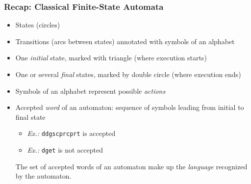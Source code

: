 \documentclass{beamer}
\begin{document}
\begin{frame}[fragile]\frametitle{Recap: Classical Finite-State Automata}
  
  \begin{itemize}
  \item States (circles)
  \item Transitions (arcs between states) annotated with symbols of an alphabet
  \item One \emph{initial} state, marked with triangle (where execution starts)
  \item One or several \emph{final} states, marked by double circle (where execution ends)
  \end{itemize}


  \begin{itemize}
  \item Symbols of an alphabet represent possible \emph{actions}
  \item Accepted \emph{word} of an automaton: sequence of symbols leading from initial to final state
    \begin{itemize}
    \item \emph{Ex.:}  \texttt{ddgscprcprt} is accepted
    \item \emph{Ex.:} \texttt{dget} is not accepted
    \end{itemize}
    The set of accepted words of an automaton make up the \emph{language} recognized by the automaton. 
  \end{itemize}

\end{frame}
\end{document}
